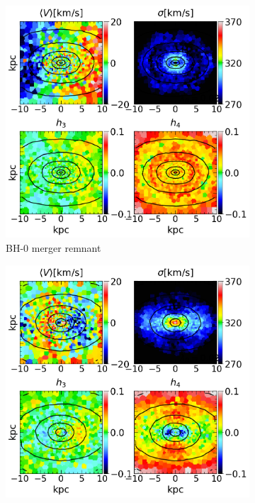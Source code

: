 \documentclass[english, oneside]{HYgradu}
\begin{document}
\begin{figure}
	\centering
	\begin{subfigure}[b]{0.49\textwidth}
		\includegraphics[width=\textwidth]{BH_0.png}
		\caption{BH-0 merger remnant}
	\end{subfigure}
	\begin{subfigure}[b]{0.49\textwidth}
		\includegraphics[width=\textwidth]{BH_6.png}

\end{subfigure}
\end{figure}
\end{document}
